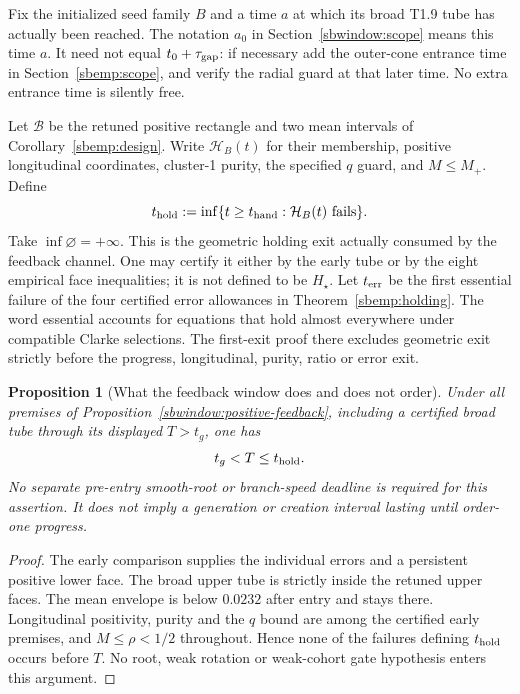 \documentclass{article} %
\theoremstyle{plain}
\newtheorem{proposition}[theorem]{Proposition}
\theoremstyle{definition}
\theoremstyle{remark}
\begin{document}
Fix the initialized seed family $B$ and a time $a$ at which its broad
T1.9 tube has actually been reached. The notation $a_0$ in
Section~\ref{sbwindow:scope} means this time $a$. It need not equal
$t_0+\tau_{\rm gap}$: if necessary add the outer-cone entrance time in
Section~\ref{sbemp:scope}, and verify the radial guard at that later time.
No extra entrance time is silently free.

Let $\mathcal B$ be the retuned positive rectangle and two mean intervals
of Corollary~\ref{sbemp:design}. Write $\mathcal H_B(t)$ for their
membership, positive longitudinal coordinates, cluster-1 purity, the
specified $q$ guard, and $M\le M_+$. Define
\begin{equation}\label{sbguard:hold-exit}
 t_{\rm hold}:=\inf\{t\ge t_{\rm hand}:\mathcal H_B(t)
                                      \text{ fails}\}.
\end{equation}
Take $\inf\varnothing=+\infty$. This is the geometric holding exit
actually consumed by the feedback channel. One may certify it either
by the early tube or by the eight empirical face inequalities; it is
not defined to be $H_\star$.
Let $t_{\rm err}$ be the first essential failure of the four certified
error allowances in Theorem~\ref{sbemp:holding}. The word essential
accounts for equations that hold almost everywhere under compatible
Clarke selections. The first-exit proof there excludes geometric exit
strictly before the progress, longitudinal, purity, ratio or error exit.

\begin{proposition}[What the feedback window does and does not order]
\label{sbguard:early-order}
Under all premises of Proposition~\ref{sbwindow:positive-feedback},
including a certified broad tube through its displayed $T>t_g$, one has
\[
 t_g<T\le t_{\rm hold}.
\]
No separate pre-entry smooth-root or branch-speed deadline is required
for this assertion. It does not imply a generation or creation interval
lasting until order-one progress.
\end{proposition}
\begin{proof}
The early comparison supplies the individual errors and a persistent
positive lower face. The broad upper tube is strictly inside the retuned
upper faces. The mean envelope is below $0.0232$ after entry and stays
there. Longitudinal positivity, purity and the $q$ bound are among the
certified early premises, and $M\le\rho<1/2$ throughout. Hence none
of the failures defining $t_{\rm hold}$ occurs before $T$.
No root, weak rotation or weak-cohort gate hypothesis enters this argument.
\end{proof}
\end{document}

